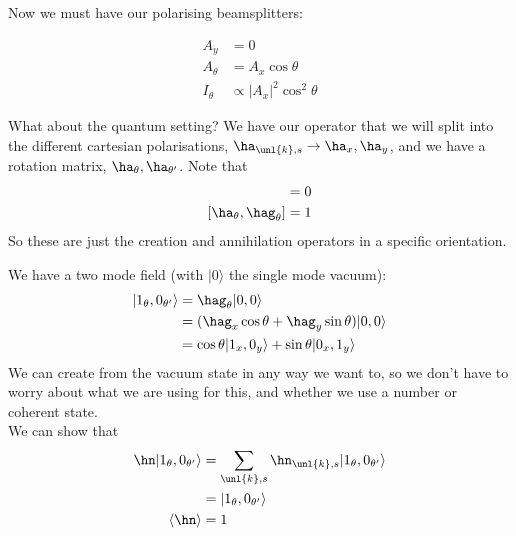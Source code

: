 \documentclass[a4paper, 11pt, normalem]{report}
\begin{document}
Now we must have our polarising beamsplitters:
\begin{multicols}{2}
\begin{figure}[H]
    \centering
\end{figure}
\begin{align}
    A_y &= 0 \\
    A_\theta &= A_x\cos\theta \\
    I_\theta &\propto |A_x|^2\cos^2\theta
\end{align}
\end{multicols}
What about the quantum setting?
We have our operator that we will split into the different cartesian polarisations, $\ha_{\unl{k},s}\to \ha_x,\ha_y$, and we have a rotation matrix, $\ha_{\theta},\ha_{\theta'}$. 
Note that 
\begin{align}
    [\ha_{\theta},\ha_{\theta'}] &= 0 \\
    [\ha_{\theta},\hag_\theta] &= 1
\end{align}
So these are just the creation and annihilation operators in a specific orientation.

\begin{example}
    We have a two mode field (with $|0\rangle$ the single mode vacuum):
    \begin{align}
        |1_\theta,0_{\theta'}\rangle &= \hag_\theta|0,0\rangle \\
                                     &= (\hag_x\cos\theta+\hag_y\sin\theta)|0,0\rangle \\
                                     &= \cos\theta|1_x,0_y\rangle + \sin\theta|0_x,1_y\rangle
    \end{align}
    We can create from the vacuum state in any way we want to, so we don't have to worry about what we are using for this, and whether we use a number or coherent state.\\
    We can show that
    \begin{align}
        \hn|1_\theta,0_{\theta'}\rangle &= \sum_{\unl{k},s} \hn_{\unl{k},s}|1_\theta,0_{\theta'}\rangle \\
                                        &= |1_\theta,0_{\theta'}\rangle \\
        \langle\hn\rangle &= 1
    \end{align}
\end{example}
\end{document}
